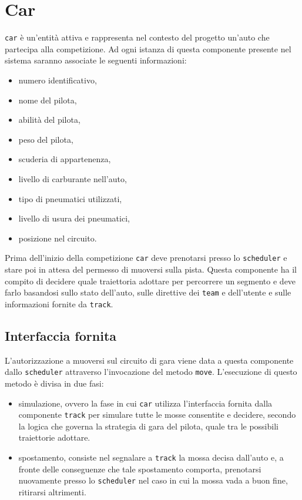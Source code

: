 \documentclass[a4paper]{report}
\newcommand{\fun}[1]{\texttt{#1}}
\begin{document}
\section{Car}
\texttt{car} è un'entità attiva e rappresenta nel contesto del progetto un'auto che partecipa alla competizione. Ad ogni istanza di questa componente presente nel sistema saranno associate le seguenti informazioni:
\begin{itemize}
\item numero identificativo,
\item nome del pilota,
\item abilità del pilota,
\item peso del pilota,
\item scuderia di appartenenza,
\item livello di carburante nell'auto,
\item tipo di pneumatici utilizzati,
\item livello di usura dei pneumatici,
\item posizione nel circuito.
\end{itemize}
Prima dell'inizio della competizione \texttt{car} deve prenotarsi presso lo \texttt{scheduler} e stare poi in attesa del permesso di muoversi sulla pista.
Questa componente ha il compito di decidere quale traiettoria adottare per percorrere un segmento e deve farlo basandosi sullo stato dell'auto, sulle direttive dei \texttt{team} e dell'utente e sulle informazioni fornite da \texttt{track}.

\subsection*{Interfaccia fornita}
L'autorizzazione a muoversi sul circuito di gara viene data a questa componente dallo \texttt{scheduler} attraverso l'invocazione del metodo \fun{move}. L'esecuzione di questo metodo è divisa in due fasi:
\begin{itemize}
\item simulazione, ovvero la fase in cui \texttt{car} utilizza l'interfaccia fornita dalla componente \texttt{track} per simulare tutte le mosse consentite e decidere, secondo la logica che governa la strategia di gara del pilota, quale tra le possibili traiettorie adottare.
\item spostamento, consiste nel segnalare a \texttt{track} la mossa decisa dall'auto e, a fronte delle conseguenze che tale spostamento comporta, prenotarsi nuovamente presso lo \texttt{scheduler} nel caso in cui la mossa vada a buon fine, ritirarsi altrimenti.
\end{itemize}
\end{document}
